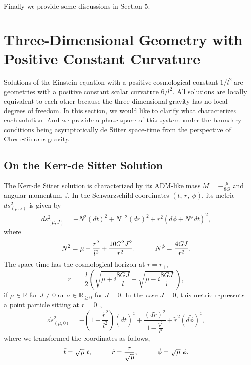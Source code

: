 \documentclass[a4paper,11pt]{article}
\begin{document}
Finally we provide some discussions in Section 5.

\section{Three-Dimensional Geometry with Positive Constant Curvature}
Solutions of the Einstein equation with a positive cosmological constant 
$1/l^2$ are geometries with a positive constant scalar curvature $6/l^2$.
All solutions are locally equivalent to each other 
because the three-dimensional gravity has no local degrees of freedom.
In this section, we would like to clarify what characterizes 
each solution.
And we provide a phase space of this system under the boundary conditions 
being asymptotically de Sitter space-time from the perspective of 
Chern-Simons gravity.
\subsection{On the Kerr-de Sitter Solution}
The Kerr-de Sitter solution is characterized by its ADM-like mass 
$M=-\frac{\mu}{8G}$ and angular momentum $J$.
In the Schwarzschild coordinates $(t, \ r, \ \phi)$, 
its metric $ds^2_{(\mu, J)}$ is given by 
\begin{eqnarray}
\label{KdS-metric}
ds^2_{(\mu, J)}=-N^2 (dt)^2 +N^{-2} (dr)^2
    +r^2 \left(d\phi+N^{\phi}dt\right)^2,
\end{eqnarray}
where 
\begin{equation}
 N^2=\mu-\frac{r^2}{l^2}+\frac{16G^2J^2}{r^2}, \hspace{10mm}
 N^\phi=\frac{4GJ}{r^2}.
\end{equation}
The space-time has the cosmological horizon at $r=r_+$,
\begin{equation}
 r_+=\frac{l}{2}\left( \sqrt{\mu+i\frac{8GJ}{l}}
                +\sqrt{\mu-i\frac{8GJ}{l}} ~\right),
\end{equation}
if $\mu \in \mathbb{R}$ for $J\neq 0$ or $\mu \in \mathbb{R}_{\geq 0}$ for $J=0$. 
In the case $J=0$, this metric represents a point particle sitting at
$r=0$~\cite{Deser-Jackiw}, 
\begin{equation}
\label{pt-particle}
 ds^2_{(\mu, 0)}=
   -\left(1-\frac{\tilde{r}^2}{l^2}\right)\left(d\tilde{t}\right)^2
       +\frac{\left(d\tilde{r}\right)^2}{1-\frac{\tilde{r}^2}{l^2}}
        +\tilde{r}^2\left(d\tilde{\phi}\right)^2,
\end{equation}
where we transformed the coordinates as follows,
\begin{equation}
 \tilde{t}=\sqrt{\mu} ~t, \hspace{10mm}
 \tilde{r}=\frac{r}{\sqrt{\mu}}, \hspace{10mm}
 \tilde{\phi}=\sqrt{\mu} ~\phi.
\end{equation}
\end{document}
